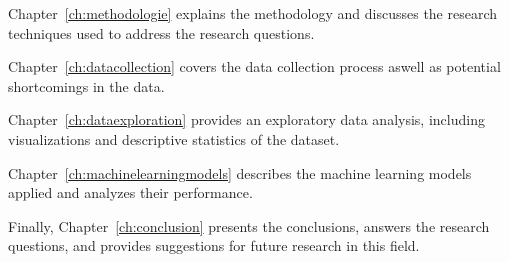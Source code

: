 Chapter~\ref{ch:methodologie} explains the methodology and discusses the research techniques used to address the research questions.

Chapter~\ref{ch:datacollection} covers the data collection process aswell as potential shortcomings in the data.

Chapter~\ref{ch:dataexploration} provides an exploratory data analysis, including visualizations and descriptive statistics of the dataset.

Chapter~\ref{ch:machinelearningmodels} describes the machine learning models applied and analyzes their performance.

Finally, Chapter~\ref{ch:conclusion} presents the conclusions, answers the research questions, and provides suggestions for future research in this field.